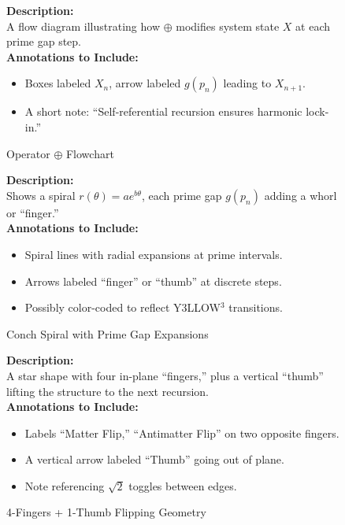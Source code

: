 \documentclass[11pt]{article}
\begin{document}
\begin{figure}[p]
\caption{Operator \texorpdfstring{$\oplus$}{\oplus} Flowchart}
\label{fig:oplusFlow}
\textbf{Description:}\\
A flow diagram illustrating how \(\oplus\) modifies system state \(X\) at each prime gap step.\\[0.5em]
\textbf{Annotations to Include:}
\begin{itemize}
    \item Boxes labeled $X_n$, arrow labeled $g(p_n)$ leading to $X_{n+1}$.
    \item A short note: “Self-referential recursion ensures harmonic lock-in.”
\end{itemize}
\end{figure}

\begin{figure}[p]
\caption{Conch Spiral with Prime Gap Expansions}
\label{fig:conchSpiral}
\textbf{Description:}\\
Shows a spiral \(r(\theta) = a e^{b\theta}\), each prime gap \(g(p_n)\) adding a whorl or “finger.”\\[0.5em]
\textbf{Annotations to Include:}
\begin{itemize}
    \item Spiral lines with radial expansions at prime intervals.
    \item Arrows labeled “finger” or “thumb” at discrete steps.
    \item Possibly color-coded to reflect Y3LLOW$^3$ transitions.
\end{itemize}
\end{figure}

\begin{figure}[p]
\caption{4-Fingers + 1-Thumb Flipping Geometry}
\label{fig:fourFingers}
\textbf{Description:}\\
A star shape with four in-plane “fingers,” plus a vertical “thumb” lifting the structure to the next recursion.\\[0.5em]
\textbf{Annotations to Include:}
\begin{itemize}
    \item Labels “Matter Flip,” “Antimatter Flip” on two opposite fingers.
    \item A vertical arrow labeled “Thumb” going out of plane.
    \item Note referencing $\sqrt{2}$ toggles between edges.
\end{itemize}
\end{figure}
\end{document}
